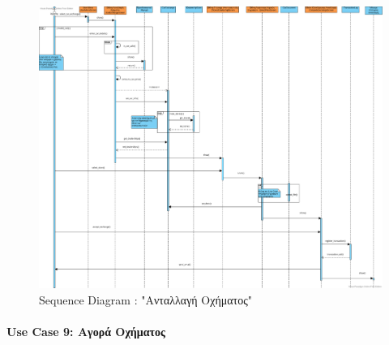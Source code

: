 \documentclass{../ol-softwaremanual}
\begin{document}
	\newpage
	
	\begin{figure}[htbp!]
		\centering
		\includegraphics[scale=0.24]{img/seq_car_exchange.png}
		\caption{\en Sequence Diagram : "\gr Ανταλλαγή Οχήματος\en"\gr}
	\end{figure}
	
	
	
	\newpage
	\centering
	
	\paragraph{\en Use Case 9: \gr Αγορά Οχήματος\gr}
	
\end{document}

